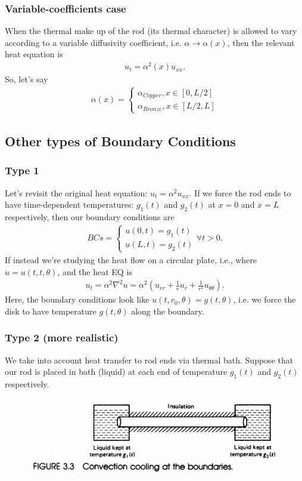 \documentclass{article}
\theoremstyle{definition}
\begin{document}
\subsubsection{Variable-coefficients case}
When the thermal make up of the rod (its thermal character) is allowed to vary according to a variable diffusivity coefficient, i.e. $\alpha \rightarrow \alpha(x)$, then the relevant heat equation is
\begin{align*}
u_t = \alpha^2(x)u_{xx}.
\end{align*}
So, let's say
\begin{align*}
\alpha(x) = 
\begin{cases*}
\alpha_{Copper}, x\in[0,L/2]\\
\alpha_{Bronze}, x\in[L/2,L]
\end{cases*}
\end{align*}
\subsection{Other types of Boundary Conditions}
\subsubsection{Type 1}
Let's revisit the original heat equation: $u_t = \alpha^2 u_{xx}$. If we force the rod ends to have time-dependent temperatures: $g_1(t)$ and $g_2(t)$ at $x=0$ and $x=L$ respectively, then our boundary conditions are
\begin{align*}
BCs = 
\begin{cases*}
u(0,t) = g_1(t)\\
u(L,t) = g_2(t)
\end{cases*}
\forall t > 0.
\end{align*} 
If instead we're studying the heat flow on a circular plate, i.e., where $u = u(t,t,\theta)$, and the heat EQ is 
\begin{align*}
u_t = \alpha^2 \nabla^2 u = \alpha^2\left( u_{rr} + \frac{1}{r}u_r + \frac{1}{r^2}u_{\theta\theta} \right).
\end{align*}
Here, the boundary conditions look like $u(t,r_0,\theta) = g(t,\theta)$, i.e. we force the disk to have temperature $g(t,\theta)$ along the boundary.
\subsubsection{Type 2 (more realistic)}
We take into account heat transfer to rod ends via thermal bath. Suppose that our rod is placed in bath (liquid) at each end of temperature $g_1(t)$ and $g_2(t)$ respectively. 
\begin{figure}[h!]
	\centering
	\includegraphics[scale=0.7]{type2.png}
\end{figure}
\end{document}
